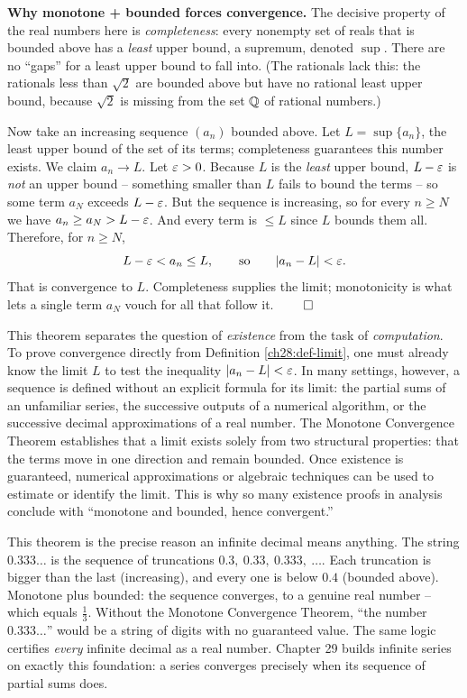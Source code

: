\begin{whybox}
\textbf{Why monotone + bounded forces convergence.} The decisive property of the
real numbers here is \emph{completeness}: every nonempty set of reals
that is bounded above has a \emph{least} upper bound, a supremum, denoted $\sup$.
There are no ``gaps'' for a least upper bound to fall into. (The rationals lack
this: the rationals less than $\sqrt2$ are bounded above but have no rational
least upper bound, because $\sqrt2$ is missing from the set $\mathbb{Q}$ of rational numbers.)

Now take an increasing sequence $(a_n)$ bounded above. Let $L = \sup\{a_n\}$, the
least upper bound of the set of its terms; completeness guarantees this number
exists. We claim $a_n \to L$. Let $\varepsilon > 0$. Because $L$ is the \emph{least}
upper bound, $L - \varepsilon$ is \emph{not} an upper bound -- something smaller than $L$
fails to bound the terms -- so some term $a_N$ exceeds $L - \varepsilon$. But the
sequence is increasing, so for every $n \ge N$ we have $a_n \ge a_N > L - \varepsilon$.
And every term is $\le L$ since $L$ bounds them all. Therefore, for $n \ge N$,
\[
  L - \varepsilon < a_n \le L,
  \qquad\text{so}\qquad
  \lvert a_n - L\rvert < \varepsilon .
\]
That is convergence to $L$. Completeness supplies the limit; monotonicity is what lets
a single term $a_N$ vouch for all that follow it. $\qed$
\end{whybox}

\begin{aestheticbox}
This theorem separates the question of \emph{existence} from the task of
\emph{computation}. To prove convergence directly from Definition \ref{ch28:def-limit},
one must already know the limit $L$ to test the inequality $\lvert a_n - L\rvert < \varepsilon$.
In many settings, however, a sequence is defined without an explicit formula for its
limit: the partial sums of an unfamiliar series, the successive outputs of a numerical algorithm,
or the successive decimal approximations of a real number. The Monotone Convergence
Theorem establishes that a limit exists solely from two structural properties: that
the terms move in one direction and remain bounded. Once existence is guaranteed,
numerical approximations or algebraic techniques can be used to estimate or identify
the limit. This is why so many existence proofs in analysis conclude with
``monotone and bounded, hence convergent.''
\end{aestheticbox}

\begin{connectionbox}
This theorem is the precise reason an infinite decimal means anything. The string
$0.333\ldots$ is the sequence of truncations $0.3,\ 0.33,\ 0.333,\ \dots$. Each
truncation is bigger than the last (increasing), and every one is below $0.4$
(bounded above). Monotone plus bounded: the sequence converges, to a genuine real
number -- which equals $\tfrac13$. Without the Monotone Convergence
Theorem, ``the number $0.333\ldots$'' would be a string of digits with no
guaranteed value. The same logic certifies \emph{every} infinite decimal as a
real number. Chapter 29 builds infinite series on exactly this foundation:
a series converges precisely when its sequence of partial sums does.
\end{connectionbox}

